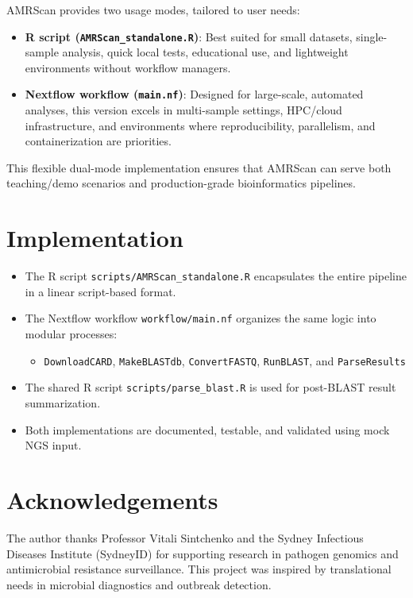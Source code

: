 AMRScan provides two usage modes, tailored to user needs:

\begin{itemize}
\item
  \textbf{R script (\texttt{AMRScan\_standalone.R})}: Best suited for
  small datasets, single-sample analysis, quick local tests, educational
  use, and lightweight environments without workflow managers.
\item
  \textbf{Nextflow workflow (\texttt{main.nf})}: Designed for
  large-scale, automated analyses, this version excels in multi-sample
  settings, HPC/cloud infrastructure, and environments where
  reproducibility, parallelism, and containerization are priorities.
\end{itemize}

This flexible dual-mode implementation ensures that AMRScan can serve
both teaching/demo scenarios and production-grade bioinformatics
pipelines.

\section{Implementation}\label{implementation}

\begin{itemize}
\tightlist
\item
  The R script \texttt{scripts/AMRScan\_standalone.R} encapsulates the
  entire pipeline in a linear script-based format.
\item
  The Nextflow workflow \texttt{workflow/main.nf} organizes the same
  logic into modular processes:

  \begin{itemize}
  \tightlist
  \item
    \texttt{DownloadCARD}, \texttt{MakeBLASTdb}, \texttt{ConvertFASTQ},
    \texttt{RunBLAST}, and \texttt{ParseResults}
  \end{itemize}
\item
  The shared R script \texttt{scripts/parse\_blast.R} is used for
  post-BLAST result summarization.
\item
  Both implementations are documented, testable, and validated using
  mock NGS input.
\end{itemize}

\section{Acknowledgements}\label{acknowledgements}

The author thanks Professor Vitali Sintchenko and the Sydney Infectious
Diseases Institute (SydneyID) for supporting research in pathogen
genomics and antimicrobial resistance surveillance. This project was
inspired by translational needs in microbial diagnostics and outbreak
detection.

